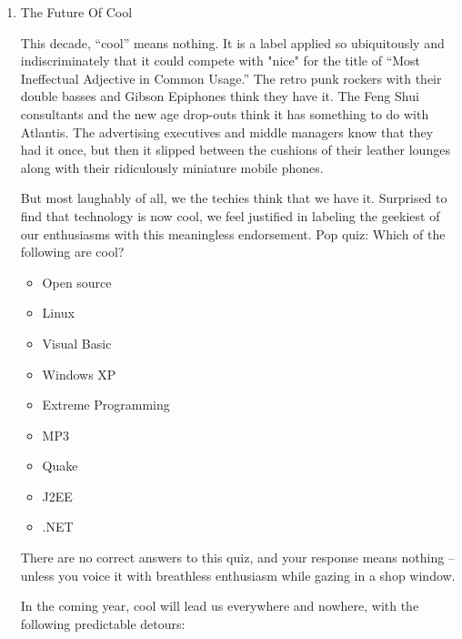 \documentclass{article}
\begin{document}
\begin{enumerate}
\item The Future Of Cool
\label{sec:orgheadline409}

This decade, “cool” means nothing. It is a label applied so ubiquitously
and indiscriminately that it could compete with "nice" for the title of
“Most Ineffectual Adjective in Common Usage.” The retro punk rockers
with their double basses and Gibson Epiphones think they have it. The
Feng Shui consultants and the new age drop-outs think it has something
to do with Atlantis. The advertising executives and middle managers know
that they had it once, but then it slipped between the cushions of their
leather lounges along with their ridiculously miniature mobile phones.

But most laughably of all, we the techies think that we have it.
Surprised to find that technology is now cool, we feel justified in
labeling the geekiest of our enthusiasms with this meaningless
endorsement. Pop quiz: Which of the following are cool?

\begin{itemize}
\item Open source
\item Linux
\item Visual Basic
\item Windows XP
\item Extreme Programming
\item MP3
\item Quake
\item J2EE
\item .NET
\end{itemize}

There are no correct answers to this quiz, and your response means
nothing -- unless you voice it with breathless enthusiasm while gazing
in a shop window.

In the coming year, cool will lead us everywhere and nowhere, with the
following predictable detours:


\end{enumerate}
\end{document}
